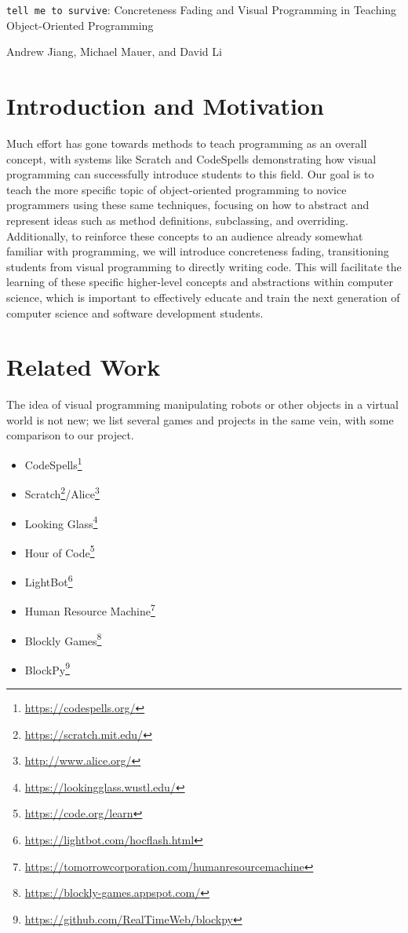 \documentclass[12pt,notitlepage]{article}
\newcommand\footnoteref[1]{\footnote{\url{#1}}}
\begin{document}
\begingroup
  \centering
  {\Large \texttt{tell me to survive}: Concreteness Fading and Visual
    Programming in Teaching Object-Oriented Programming\\[1em]}

  Andrew Jiang, Michael Mauer, and David Li\par
\endgroup

\section{Introduction and Motivation}

Much effort has gone towards methods to teach programming as an
overall concept, with systems like Scratch and CodeSpells
demonstrating how visual programming can successfully introduce
students to this field. Our goal is to teach the more specific topic
of object-oriented programming to novice programmers using these same
techniques, focusing on how to abstract and represent ideas such as
method definitions, subclassing, and overriding. Additionally, to
reinforce these concepts to an audience already somewhat familiar with
programming, we will introduce concreteness fading, transitioning
students from visual programming to directly writing code. This will
facilitate the learning of these specific higher-level concepts and
abstractions within computer science, which is important to
effectively educate and train the next generation of computer science
and software development students.

\section{Related Work}

The idea of visual programming manipulating robots or other objects in
a virtual world is not new; we list several games and projects in the
same vein, with some comparison to our project.

\begin{multicols}{2}
\begin{itemize}
\item CodeSpells\footnoteref{https://codespells.org/}
\item Scratch\footnoteref{https://scratch.mit.edu/}/Alice\footnoteref{http://www.alice.org/}
\item Looking Glass\footnoteref{https://lookingglass.wustl.edu/}
\item Hour of Code\footnoteref{https://code.org/learn}
\item LightBot\footnoteref{https://lightbot.com/hocflash.html}
\item Human Resource Machine\footnoteref{https://tomorrowcorporation.com/humanresourcemachine}
\item Blockly Games\footnoteref{https://blockly-games.appspot.com/}
\item BlockPy\footnoteref{https://github.com/RealTimeWeb/blockpy}
\end{itemize}
\end{multicols}
\end{document}
